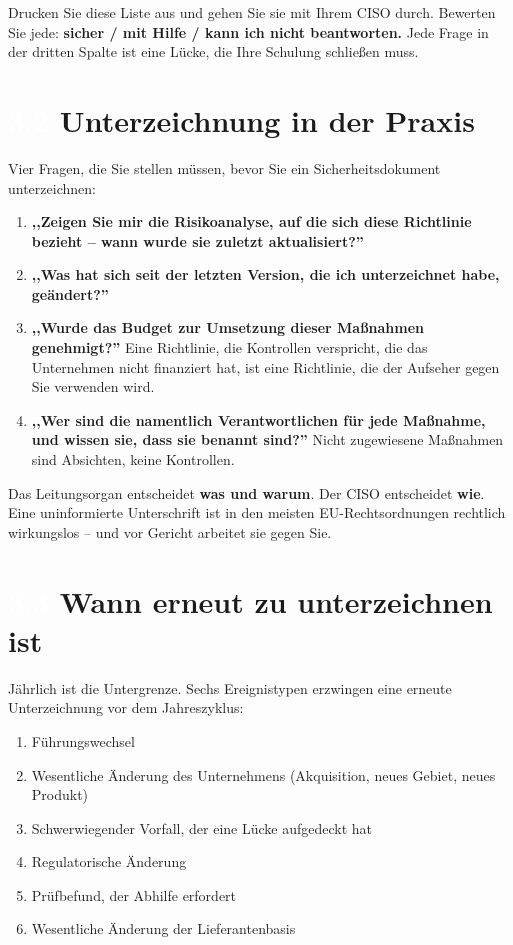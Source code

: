 \documentclass[11pt,a4paper,twoside]{book}
\newcommand{\lessontag}[1]{%
  \texorpdfstring{%
    \setlength{\fboxsep}{3pt}\colorbox{nisd2blue}{\textcolor{white}{\footnotesize\bfseries #1}}\quad%
  }{Lektion #1\ }%
}
\begin{document}
\begin{actionbox}
Drucken Sie diese Liste aus und gehen Sie sie mit Ihrem CISO durch. Bewerten Sie jede: \textbf{sicher / mit Hilfe / kann ich nicht beantworten.} Jede Frage in der dritten Spalte ist eine Lücke, die Ihre Schulung schließen muss.
\end{actionbox}

\section{\lessontag{3.2}Unterzeichnung in der Praxis}

Vier Fragen, die Sie stellen müssen, bevor Sie ein Sicherheitsdokument unterzeichnen:

\begin{enumerate}
  \item \textbf{,,Zeigen Sie mir die Risikoanalyse, auf die sich diese Richtlinie bezieht -- wann wurde sie zuletzt aktualisiert?''}
  \item \textbf{,,Was hat sich seit der letzten Version, die ich unterzeichnet habe, geändert?''}
  \item \textbf{,,Wurde das Budget zur Umsetzung dieser Maßnahmen genehmigt?''} Eine Richtlinie, die Kontrollen verspricht, die das Unternehmen nicht finanziert hat, ist eine Richtlinie, die der Aufseher gegen Sie verwenden wird.
  \item \textbf{,,Wer sind die namentlich Verantwortlichen für jede Maßnahme, und wissen sie, dass sie benannt sind?''} Nicht zugewiesene Maßnahmen sind Absichten, keine Kontrollen.
\end{enumerate}

Das Leitungsorgan entscheidet \textbf{was und warum}. Der CISO entscheidet \textbf{wie}. Eine uninformierte Unterschrift ist in den meisten EU-Rechtsordnungen rechtlich wirkungslos -- und vor Gericht arbeitet sie gegen Sie.

\section{\lessontag{3.3}Wann erneut zu unterzeichnen ist}

Jährlich ist die Untergrenze. Sechs Ereignistypen erzwingen eine erneute Unterzeichnung vor dem Jahreszyklus:

\begin{enumerate}
  \item Führungswechsel
  \item Wesentliche Änderung des Unternehmens (Akquisition, neues Gebiet, neues Produkt)
  \item Schwerwiegender Vorfall, der eine Lücke aufgedeckt hat
  \item Regulatorische Änderung
  \item Prüfbefund, der Abhilfe erfordert
  \item Wesentliche Änderung der Lieferantenbasis
\end{enumerate}
\end{document}
